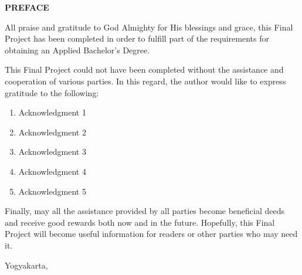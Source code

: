 \clearpage
{}
{}
\begin{center}
    \textbf{\large PREFACE}\\[3em]
\end{center}

All praise and gratitude to God Almighty for His blessings and grace, this Final Project has been completed in order to fulfill part of the requirements for obtaining an Applied Bachelor's Degree.

This Final Project could not have been completed without the assistance and cooperation of various parties. In this regard, the author would like to express gratitude to the following:

\begin{enumerate}
    \item Acknowledgment 1
    \item Acknowledgment 2
    \item Acknowledgment 3
    \item Acknowledgment 4
    \item Acknowledgment 5
\end{enumerate}

Finally, may all the assistance provided by all parties become beneficial deeds and receive good rewards both now and in the future. Hopefully, this Final Project will become useful information for readers or other parties who may need it.

\begin{flushright}
    Yogyakarta, \endorsementdate\\[1.25cm]
    \authorname \\
    \studentid
\end{flushright}
